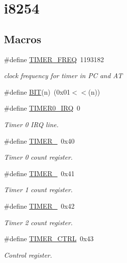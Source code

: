 \hypertarget{group__i8254}{}\section{i8254}
\label{group__i8254}
\subsection*{Macros}
\begin{DoxyCompactItemize}
\item 
\#define \mbox{\hyperlink{group__i8254_gacf926951944b6cf370b7229ebd50dd8b}{T\+I\+M\+E\+R\+\_\+\+F\+R\+EQ}}~1193182
\begin{DoxyCompactList}\small\item\em clock frequency for timer in PC and AT \end{DoxyCompactList}\item 
\#define \mbox{\hyperlink{group__i8254_ga3a8ea58898cb58fc96013383d39f482c}{B\+IT}}(n)~(0x01$<$$<$(n))
\item 
\#define \mbox{\hyperlink{group__i8254_ga30bf84c312af248cb81bb224e09f9ba8}{T\+I\+M\+E\+R0\+\_\+\+I\+RQ}}~0
\begin{DoxyCompactList}\small\item\em Timer 0 I\+RQ line. \end{DoxyCompactList}\item 
\#define \mbox{\hyperlink{group__i8254_gacc9ff9df4a9674a1ce9ba08fc4a4679e}{T\+I\+M\+E\+R\+\_}}~0x40
\begin{DoxyCompactList}\small\item\em Timer 0 count register. \end{DoxyCompactList}\item 
\#define \mbox{\hyperlink{group__i8254_gac62c99c2a9289891c1b83052242cca49}{T\+I\+M\+E\+R\+\_}}~0x41
\begin{DoxyCompactList}\small\item\em Timer 1 count register. \end{DoxyCompactList}\item 
\#define \mbox{\hyperlink{group__i8254_ga1f34f18ad0ab8cace46b615773b48735}{T\+I\+M\+E\+R\+\_}}~0x42
\begin{DoxyCompactList}\small\item\em Timer 2 count register. \end{DoxyCompactList}\item 
\#define \mbox{\hyperlink{group__i8254_ga282832448fb0281ef53d243c1cd48491}{T\+I\+M\+E\+R\+\_\+\+C\+T\+RL}}~0x43
\begin{DoxyCompactList}\small\item\em Control register. \end{DoxyCompactList}\item 
$$
\end{DoxyCompactItemize}
